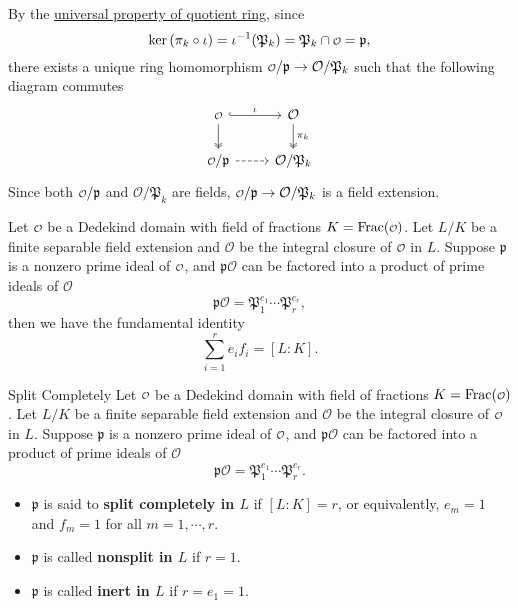 \begin{prf}
    By the \hyperref[th:universal_property_of_quotient_ring]{universal property of quotient ring}, since 
    \[
    \ker \left( \pi_k\circ \iota\right)=\iota^{-1}(\mathfrak{P}_k)=\mathfrak{P}_k \cap \mathcalo=\mathfrak{p},
    \]
    there exists a unique ring homomorphism $\mathcalo/\mathfrak{p}\to \mathcal{O}/\mathfrak{P}_k$ such that the following diagram commutes
    \[
        \begin{tikzcd}
            \mathcalo \arrow[r, "\iota", hook] \arrow[d, two heads] & \mathcal{O} \arrow[d, "\pi_k", two heads] \\
            \mathcalo/\mathfrak{p} \arrow[r, dashed]                & \mathcal{O}/\mathfrak{P}_k               
            \end{tikzcd}
    \]
    Since both $\mathcalo/\mathfrak{p}$ and $\mathcal{O}/\mathfrak{P}_k$ are fields, $\mathcalo/\mathfrak{p}\to \mathcal{O}/\mathfrak{P}_k$ is a field extension. 
\end{prf}


\begin{proposition}{}{}
    Let $\mathcalo$ be a Dedekind domain with field of fractions $K=\mathrm{Frac}(\mathcalo)$. Let $L/K$ be a finite separable field extension and $\mathcal{O}$ be the integral closure of $\mathcalo$ in $L$. Suppose $\mathfrak{p}$ is a nonzero prime ideal of $\mathcalo$, and $\mathfrak{p}\mathcal{O}$ can be factored into a product of prime ideals of $\mathcal{O}$ 
    \[
    \mathfrak{p}\mathcal{O}=\mathfrak{P}_1^{e_1}\cdots\mathfrak{P}_r^{e_r},
    \]
    then we have the fundamental identity
    \[
    \sum_{i=1}^r e_i f_i=[L:K].
    \]
 
\end{proposition}
\begin{definition}{Split Completely}{}
    Let $\mathcalo$ be a Dedekind domain with field of fractions $K=\mathrm{Frac}(\mathcalo)$. Let $L/K$ be a finite separable field extension and $\mathcal{O}$ be the integral closure of $\mathcalo$ in $L$. Suppose $\mathfrak{p}$ is a nonzero prime ideal of $\mathcalo$, and $\mathfrak{p}\mathcal{O}$ can be factored into a product of prime ideals of $\mathcal{O}$ 
    \[
    \mathfrak{p}\mathcal{O}=\mathfrak{P}_1^{e_1}\cdots\mathfrak{P}_r^{e_r}.
    \]
    \begin{itemize}
        \item $\mathfrak{p}$ is said to \textbf{split completely in $L$} if $[L:K]=r$, or equivalently, $e_m=1$ and $f_m=1$ for all $m = 1,\cdots,r$.
        \item $\mathfrak{p}$ is called \textbf{nonsplit in $L$} if $r=1$.
        \item $\mathfrak{p}$ is called \textbf{inert in $L$} if $r=e_1=1$.
    \end{itemize}
    
\end{definition}


